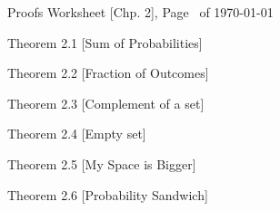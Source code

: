 \documentclass{exam}
\begin{document}
\pagestyle{head}
\runningheadrule
{}
{Proofs Worksheet [Chp. 2], Page \thepage\ of \numpages}
{\today}

\begin{questions}

\question
Theorem 2.1 [Sum of Probabilities]

\question
Theorem 2.2 [Fraction of Outcomes]

\question
Theorem 2.3 [Complement of a set]

\newpage

\question
Theorem 2.4 [Empty set]

\question
Theorem 2.5 [My Space is Bigger]

\question
Theorem 2.6 [Probability Sandwich]


\end{questions}
\end{document}
